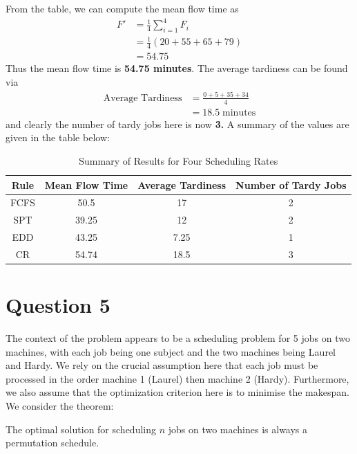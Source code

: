 \documentclass[12pt]{article}
\begin{document}
\noindent From the table, we can compute the mean flow time as \begin{align*}
    F' &= \frac{1}{4} \sum_{i=1}^{4} F_i \\ 
    &= \frac{1}{4} \left( 20 + 55 + 65 + 79 \right) \\ 
    &= 54.75
\end{align*} Thus the mean flow time is \textbf{54.75 minutes}. The average tardiness can be found via \begin{align*}
    \text{Average Tardiness} &= \frac{0 + 5 + 35 + 34}{4} \\ 
    &= 18.5 \; \text{minutes}
\end{align*} and clearly the number of tardy jobs here is now \textbf{3.} A summary of the values are given in the table below: \begin{table}[H]
    \centering
    \begin{tabular}{c c c c} \toprule
        \textbf{Rule} & \textbf{Mean Flow Time} & \textbf{Average Tardiness} & \textbf{Number of Tardy Jobs} \\ \midrule
        FCFS & 50.5 & 17 & 2 \\ 
        SPT & 39.25 & 12 & 2 \\ 
        EDD & 43.25 & 7.25 & 1 \\ 
        CR & 54.74 & 18.5 & 3 \\ \bottomrule
    \end{tabular}
    \caption{Summary of Results for Four Scheduling Rates}
    \label{tab:4-summary}
\end{table}

\newpage 

\section*{Question 5}

The context of the problem appears to be a scheduling problem for 5 jobs on two machines, with each job being one subject and the two machines being Laurel and Hardy. We rely on the crucial assumption here that each job must be processed in the order machine 1 (Laurel) then machine 2 (Hardy). Furthermore, we also assume that the optimization criterion here is to minimise the makespan. We consider the theorem: \\ 

\begin{theorem}
    The optimal solution for scheduling $n$ jobs on two machines is always a permutation schedule.
\end{theorem} 
\end{document}
